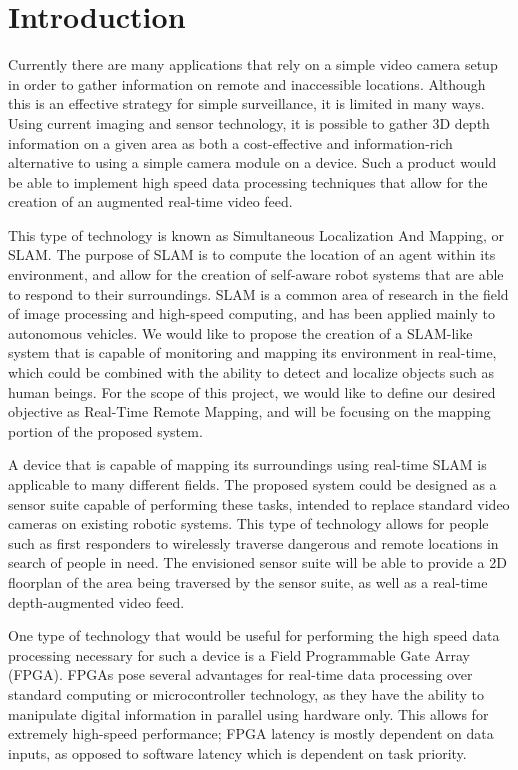 \section{Introduction}
Currently there are many applications that rely on a simple video camera setup in order to gather information on remote and inaccessible locations. Although this is an effective strategy for simple surveillance, it is limited in many ways. Using current imaging and sensor technology, it is possible to gather 3D depth information on a given area as both a cost-effective and information-rich alternative to using a simple camera module on a device. Such a product would be able to implement high speed data processing techniques that allow for the creation of an augmented real-time video feed.
\par
This type of technology is known as Simultaneous Localization And Mapping, or SLAM. The purpose of SLAM is to compute the location of an agent within its environment, and allow for the creation of self-aware robot systems that are able to respond to their surroundings. SLAM is a common area of research in the field of image processing and high-speed computing, and has been applied mainly to autonomous vehicles. We would like to propose the creation of a SLAM-like system that is capable of monitoring and mapping its environment in real-time, which could be combined with the ability to detect and localize objects such as human beings. For the scope of this project, we would like to define our desired objective as Real-Time Remote Mapping, and will be focusing on the mapping portion of the proposed system.
\par
A device that is capable of mapping its surroundings using real-time SLAM is applicable to many different fields. The proposed system could be designed as a sensor suite capable of performing these tasks, intended to replace standard video cameras on existing robotic systems. This type of technology allows for people such as first responders to wirelessly traverse dangerous and remote locations in search of people in need. The envisioned sensor suite will be able to provide a 2D floorplan of the area being traversed by the sensor suite, as well as a real-time depth-augmented video feed.
\par
One type of technology that would be useful for performing the high speed data processing necessary for such a device is a Field Programmable Gate Array (FPGA). FPGAs pose several advantages for real-time data processing over standard computing or microcontroller technology, as they have the ability to manipulate digital information in parallel using hardware only. This allows for extremely high-speed performance; FPGA latency is mostly dependent on data inputs, as opposed to software latency which is dependent on task priority.
